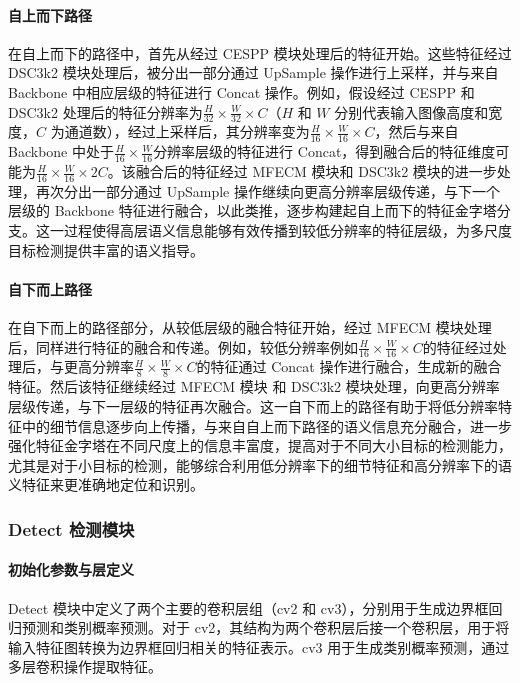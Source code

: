 \documentclass[runningheads]{llncs}
\begin{document}
\paragraph{自上而下路径}

在自上而下的路径中，首先从经过 CESPP 模块处理后的特征开始。这些特征经过 DSC3k2 模块处理后，被分出一部分通过 UpSample 操作进行上采样，并与来自 Backbone 中相应层级的特征进行 Concat 操作。例如，假设经过 CESPP 和 DSC3k2 处理后的特征分辨率为$\frac{H}{32} \times \frac{W}{32} \times C$（$H$ 和 $W$ 分别代表输入图像高度和宽度，$C$ 为通道数），经过上采样后，其分辨率变为$\frac{H}{16} \times \frac{W}{16} \times C$，然后与来自 Backbone 中处于$\frac{H}{16} \times \frac{W}{16}$分辨率层级的特征进行 Concat，得到融合后的特征维度可能为$\frac{H}{16} \times \frac{W}{16} \times 2C$。该融合后的特征经过 MFECM 模块和 DSC3k2 模块的进一步处理，再次分出一部分通过 UpSample 操作继续向更高分辨率层级传递，与下一个层级的 Backbone 特征进行融合，以此类推，逐步构建起自上而下的特征金字塔分支。这一过程使得高层语义信息能够有效传播到较低分辨率的特征层级，为多尺度目标检测提供丰富的语义指导。

\paragraph{自下而上路径}

在自下而上的路径部分，从较低层级的融合特征开始，经过 MFECM 模块处理后，同样进行特征的融合和传递。例如，较低分辨率例如$\frac{H}{16} \times \frac{W}{16} \times C$的特征经过处理后，与更高分辨率$\frac{H}{8} \times \frac{W}{8} \times C$的特征通过 Concat 操作进行融合，生成新的融合特征。然后该特征继续经过 MFECM 模块 和 DSC3k2 模块处理，向更高分辨率层级传递，与下一层级的特征再次融合。这一自下而上的路径有助于将低分辨率特征中的细节信息逐步向上传播，与来自自上而下路径的语义信息充分融合，进一步强化特征金字塔在不同尺度上的信息丰富度，提高对于不同大小目标的检测能力，尤其是对于小目标的检测，能够综合利用低分辨率下的细节特征和高分辨率下的语义特征来更准确地定位和识别。

\subsubsection{Detect 检测模块}

\paragraph{初始化参数与层定义}

Detect 模块中定义了两个主要的卷积层组（cv2 和 cv3），分别用于生成边界框回归预测和类别概率预测。对于 cv2，其结构为两个卷积层后接一个卷积层，用于将输入特征图转换为边界框回归相关的特征表示。cv3 用于生成类别概率预测，通过多层卷积操作提取特征。
\end{document}
